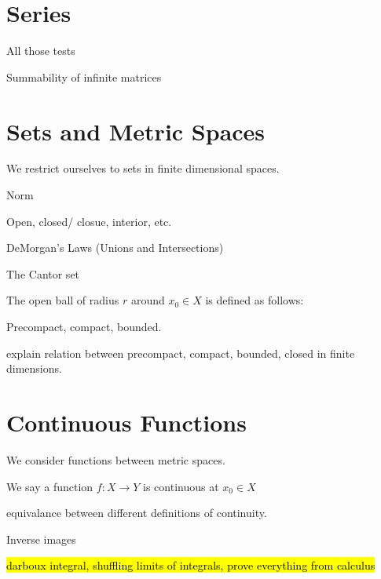 \section{Series}

All those tests

\begin{theorem}
\end{theorem}

\begin{theorem}
Summability of infinite matrices
\end{theorem}

\begin{theorem}
\end{theorem}


\section{Sets and Metric Spaces}

We restrict ourselves to sets in finite dimensional spaces.

Norm

\begin{theorem}
\end{theorem}

Open, closed/ closue, interior, etc.

DeMorgan's Laws (Unions and Intersections)

The Cantor set

\begin{definition}
    The open ball of radius $r$ around $x_0\in X$ is defined as follows:
\end{definition}

Precompact, compact, bounded.

explain relation between precompact, compact, bounded, closed in finite dimensions.

\section{Continuous Functions}
We consider functions between metric spaces.

\begin{definition}[Continuity]
    We say a function $f:X\rightarrow Y$ is continuous at $x_0\in X$
\end{definition}

equivalance between different definitions of continuity.

Inverse images

\hl{
darboux integral, shuffling limits of integrals, prove everything from calculus
}

